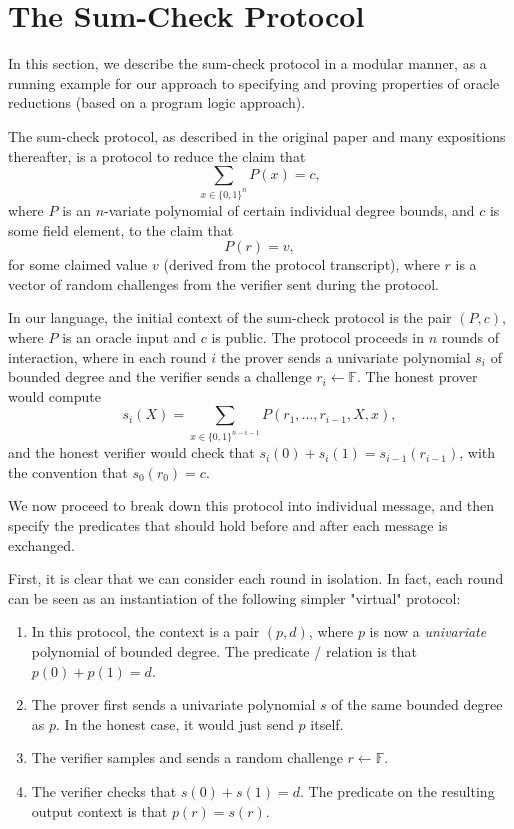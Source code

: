 \section{The Sum-Check Protocol}

In this section, we describe the sum-check protocol in a modular manner, as a running example for our approach to specifying and proving properties of oracle reductions (based on a program logic approach).

The sum-check protocol, as described in the original paper and many expositions thereafter, is a
protocol to reduce the claim that \[ \sum_{x \in \{0, 1\}^n} P(x) = c, \] where $P$ is an
$n$-variate polynomial of certain individual degree bounds, and $c$ is some field element, to the
claim that \[ P(r) = v, \] for some claimed value $v$ (derived from the protocol transcript), where
$r$ is a vector of random challenges from the verifier sent during the protocol.

In our language, the initial context of the sum-check protocol is the pair $(P, c)$, where $P$ is an
oracle input and $c$ is public. The protocol proceeds in $n$ rounds of interaction, where in each
round $i$ the prover sends a univariate polynomial $s_i$ of bounded degree and the verifier sends a
challenge $r_i \gets \mathbb{F}$. The honest prover would compute \[ s_i(X) = \sum_{x \in \{0,
1\}^{n - i - 1}} P(r_1, \ldots, r_{i - 1}, X, x), \] and the honest verifier would check that
$s_i(0) + s_i(1) = s_{i - 1}(r_{i - 1})$, with the convention that $s_0(r_0) = c$.

We now proceed to break down this protocol into individual message, and then specify the predicates that should hold before and after each message is exchanged.

First, it is clear that we can consider each round in isolation. In fact, each round can be seen as an instantiation of the following simpler "virtual" protocol:
\begin{enumerate}
    \item In this protocol, the context is a pair $(p, d)$, where $p$ is now a \emph{univariate} polynomial of bounded degree. The predicate / relation is that $p(0) + p(1) = d$.
    \item The prover first sends a univariate polynomial $s$ of the same bounded degree as $p$. In
    the honest case, it would just send $p$ itself.
    \item The verifier samples and sends a random challenge $r \gets \mathbb{F}$.
    \item The verifier checks that $s(0) + s(1) = d$. The predicate on the resulting output context
    is that $p(r) = s(r)$.
\end{enumerate}

